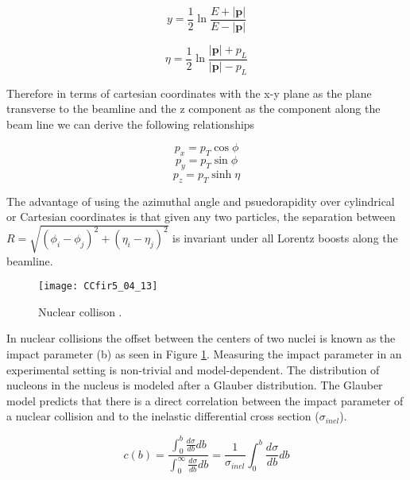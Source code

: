 \begin{equation}
\textit{y} = \frac{1}{2} \ln \frac{E + |\mathbf{p}|}{E - |\mathbf{p}|}
\label{eq:rapidity}
\end{equation}

\begin{equation}
\eta = \frac{1}{2} \ln \frac{|\mathbf{p}| + p_{L}}{|\mathbf{p}| - p_{L}}
\label{eq:psuedo}
\end{equation}

\noindent
Therefore in terms of cartesian coordinates with the x-y plane as the plane transverse to the beamline and the z component as the component along the beam line we can derive the following relationships

\begin{equation}
p_{x} = p_{T} \cos \phi
\label{eq:xcomp}
\end{equation}
\begin{equation}
p_{y} = p_{T} \sin \phi
\label{eq:ycomp}
\end{equation}
\begin{equation}
p_{z} = p_{T} \sinh \eta
\label{eq:zcomp}
\end{equation}

\noindent
The advantage of using the azimuthal angle and psuedorapidity over cylindrical or Cartesian coordinates is that given any two particles, the separation between $R = \sqrt{ (\phi_{i} - \phi_{j})^{2} + (\eta_{i} - \eta_{j})^{2}  } $ is invariant under all Lorentz boosts along the beamline.


\begin{figure}[h]
\texttt{[image: CCfir5\_04\_13]}
\centering
\caption{Nuclear collison  .}
\label{fig:centrality}
\end{figure}

\noindent
In nuclear collisions the offset between the centers of two nuclei is known as the impact parameter (b) as seen in Figure \ref{fig:centrality}.  Measuring the impact parameter in an experimental setting is non-trivial and model-dependent.  The distribution of nucleons in the nucleus is modeled after a Glauber distribution\cite{Loizides:2016djv}.  The Glauber model predicts that there is a direct correlation between the impact parameter of a nuclear collision and to the inelastic differential cross section ($\sigma_{inel}$)\cite{Miller:2007ri}.


\begin{equation}
c(b) =\frac{ \int_{0}^{b} \frac{d \sigma}{db} db}{ \int_{0}^{\infty} \frac{d \sigma}{db} db} = \frac{1}{\sigma_{inel}} \int_{0}^{b} \frac{d \sigma}{db} db
\label{eq:centrality}
\end{equation}


